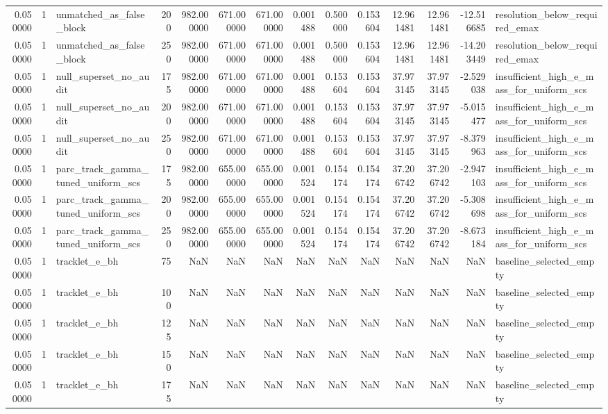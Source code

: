 \begin{tabular}{rrlrrrrrrrrrrl}
0.050000 & 1 & unmatched_as_false_block & 200 & 982.000000 & 671.000000 & 671.000000 & 0.001488 & 0.500000 & 0.153604 & 12.961481 & 12.961481 & -12.516685 & resolution_below_required_emax \\
0.050000 & 1 & unmatched_as_false_block & 250 & 982.000000 & 671.000000 & 671.000000 & 0.001488 & 0.500000 & 0.153604 & 12.961481 & 12.961481 & -14.203449 & resolution_below_required_emax \\
0.050000 & 1 & null_superset_no_audit & 175 & 982.000000 & 671.000000 & 671.000000 & 0.001488 & 0.153604 & 0.153604 & 37.973145 & 37.973145 & -2.529038 & insufficient_high_e_mass_for_uniform_scs \\
0.050000 & 1 & null_superset_no_audit & 200 & 982.000000 & 671.000000 & 671.000000 & 0.001488 & 0.153604 & 0.153604 & 37.973145 & 37.973145 & -5.015477 & insufficient_high_e_mass_for_uniform_scs \\
0.050000 & 1 & null_superset_no_audit & 250 & 982.000000 & 671.000000 & 671.000000 & 0.001488 & 0.153604 & 0.153604 & 37.973145 & 37.973145 & -8.379963 & insufficient_high_e_mass_for_uniform_scs \\
0.050000 & 1 & parc_track_gamma_tuned_uniform_scs & 175 & 982.000000 & 655.000000 & 655.000000 & 0.001524 & 0.154174 & 0.154174 & 37.206742 & 37.206742 & -2.947103 & insufficient_high_e_mass_for_uniform_scs \\
0.050000 & 1 & parc_track_gamma_tuned_uniform_scs & 200 & 982.000000 & 655.000000 & 655.000000 & 0.001524 & 0.154174 & 0.154174 & 37.206742 & 37.206742 & -5.308698 & insufficient_high_e_mass_for_uniform_scs \\
0.050000 & 1 & parc_track_gamma_tuned_uniform_scs & 250 & 982.000000 & 655.000000 & 655.000000 & 0.001524 & 0.154174 & 0.154174 & 37.206742 & 37.206742 & -8.673184 & insufficient_high_e_mass_for_uniform_scs \\
0.050000 & 1 & tracklet_e_bh & 75 & NaN & NaN & NaN & NaN & NaN & NaN & NaN & NaN & NaN & baseline_selected_empty \\
0.050000 & 1 & tracklet_e_bh & 100 & NaN & NaN & NaN & NaN & NaN & NaN & NaN & NaN & NaN & baseline_selected_empty \\
0.050000 & 1 & tracklet_e_bh & 125 & NaN & NaN & NaN & NaN & NaN & NaN & NaN & NaN & NaN & baseline_selected_empty \\
0.050000 & 1 & tracklet_e_bh & 150 & NaN & NaN & NaN & NaN & NaN & NaN & NaN & NaN & NaN & baseline_selected_empty \\
0.050000 & 1 & tracklet_e_bh & 175 & NaN & NaN & NaN & NaN & NaN & NaN & NaN & NaN & NaN & baseline_selected_empty \\

\end{tabular}
